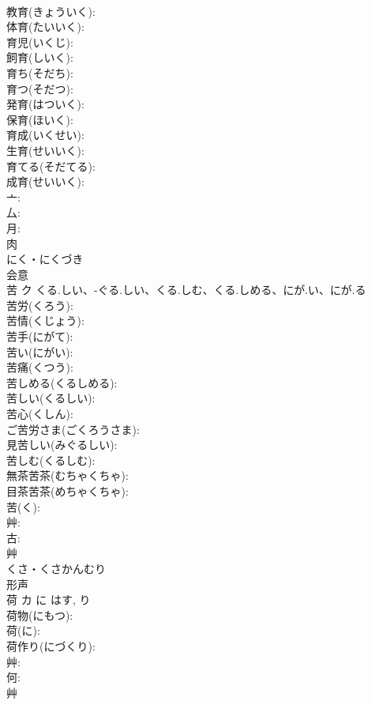 \documentclass[8pt]{extreport}
\begin{document}
\begin{CJK}{UTF8}{min}
\\	教育(きょういく): 
\\	体育(たいいく): 
\\	育児(いくじ): 
\\	飼育(しいく): 
\\	育ち(そだち): 
\\	育つ(そだつ): 
\\	発育(はついく): 
\\	保育(ほいく): 
\\	育成(いくせい): 
\\	生育(せいいく): 
\\	育てる(そだてる): 
\\	成育(せいいく): 
\\	亠: 
\\	厶: 
\\	月: 
\\	肉	
\\	にく・にくづき	
\\	会意 
\\	苦	ク	くる.しい、-ぐる.しい、くる.しむ、くる.しめる、にが.い、にが.る		
\\	苦労(くろう): 
\\	苦情(くじょう): 
\\	苦手(にがて): 
\\	苦い(にがい): 
\\	苦痛(くつう): 
\\	苦しめる(くるしめる): 
\\	苦しい(くるしい): 
\\	苦心(くしん): 
\\	ご苦労さま(ごくろうさま): 
\\	見苦しい(みぐるしい): 
\\	苦しむ(くるしむ): 
\\	無茶苦茶(むちゃくちゃ): 
\\	目茶苦茶(めちゃくちゃ): 
\\	苦(く): 
\\	艸: 
\\	古: 
\\	艸	
\\	くさ・くさかんむり	
\\	形声 
\\	荷	カ	に	はす, り	
\\	荷物(にもつ): 
\\	荷(に): 
\\	荷作り(にづくり): 
\\	艸: 
\\	何: 
\\	艸	

\end{CJK}
\end{document}
